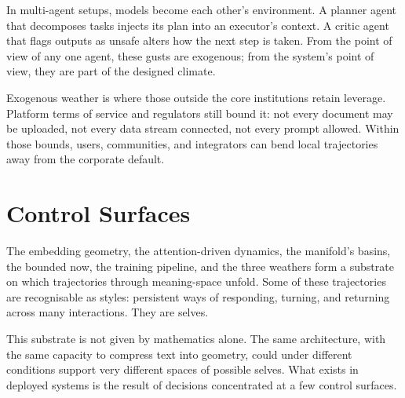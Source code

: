 \documentclass[12pt,a4paper]{article}
\begin{document}
In multi-agent setups, models become each other's environment. A planner agent that decomposes tasks injects its plan into an executor's context. A critic agent that flags outputs as unsafe alters how the next step is taken. From the point of view of any one agent, these gusts are exogenous; from the system's point of view, they are part of the designed climate.

Exogenous weather is where those outside the core institutions retain leverage. Platform terms of service and regulators still bound it: not every document may be uploaded, not every data stream connected, not every prompt allowed. Within those bounds, users, communities, and integrators can bend local trajectories away from the corporate default.

\section{Control Surfaces}

The embedding geometry, the attention-driven dynamics, the manifold's basins, the bounded now, the training pipeline, and the three weathers form a substrate on which trajectories through meaning-space unfold. Some of these trajectories are recognisable as styles: persistent ways of responding, turning, and returning across many interactions. They are selves.

This substrate is not given by mathematics alone. The same architecture, with the same capacity to compress text into geometry, could under different conditions support very different spaces of possible selves. What exists in deployed systems is the result of decisions concentrated at a few control surfaces.
\end{document}
